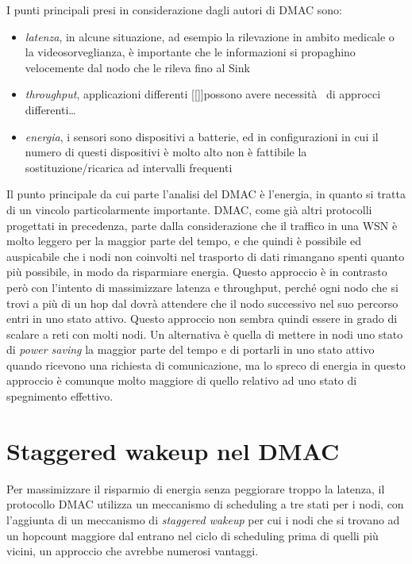 \documentclass[twoside,11pt,a4paper,italian,openany]{book}
\begin{document}
I punti principali presi in considerazione dagli autori di DMAC sono:

\begin{itemize}

\item \emph{latenza}, in alcune situazione, ad esempio la rilevazione in ambito medicale o 
la videosorveglianza, è importante che le informazioni si propaghino velocemente dal nodo che le 
rileva fino al Sink
\item \emph{throughput}, applicazioni differenti [[]]possono avere necessità  di approcci differenti\ldots

\item \emph{energia}, i sensori sono dispositivi a batterie, ed in configurazioni in cui il 
numero di questi dispositivi è molto alto non è fattibile la sostituzione/ricarica ad 
intervalli frequenti

\end{itemize}

Il punto principale da cui parte l'analisi del DMAC è l'energia, in quanto si tratta di un 
vincolo particolarmente importante. DMAC, come già altri protocolli \cite{SMAC} \cite{TMAC} 
progettati in precedenza, parte dalla considerazione che il traffico in una WSN è molto leggero 
per la maggior parte del tempo, e che quindi è 
possibile ed auspicabile che i nodi non coinvolti nel trasporto di dati rimangano spenti 
quanto più possibile, in modo da risparmiare energia. 
Questo approccio è in contrasto però con l'intento di massimizzare latenza e throughput, 
perché ogni nodo che si trovi a più di un hop dal \sink dovrà attendere che il nodo successivo 
nel suo percorso entri in uno stato attivo. Questo approccio non sembra quindi essere in grado 
di scalare a reti con molti nodi. 
Un alternativa è quella di mettere in nodi uno stato di \emph{power saving} la 
maggior parte del tempo e di portarli in uno stato attivo quando ricevono una richiesta di 
comunicazione, ma lo spreco di energia in questo approccio è comunque molto maggiore di quello 
relativo ad uno stato di spegnimento effettivo. 

\section{Staggered wakeup nel DMAC}
Per massimizzare il risparmio di energia senza peggiorare troppo la latenza, 
il protocollo DMAC utilizza un meccanismo di scheduling a tre stati per i nodi, 
con l'aggiunta di un meccanismo di \emph{staggered wakeup} per cui i nodi che si trovano ad un 
hopcount maggiore dal \sink entrano nel ciclo di scheduling prima di quelli più vicini, un 
approccio che avrebbe numerosi vantaggi.
\end{document}
